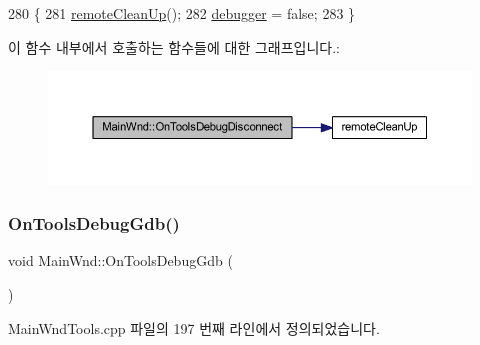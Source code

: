 \begin{DoxyCode}
280 \{
281   \mbox{\hyperlink{_main_wnd_tools_8cpp_ad472decd8f1a11c276d8bfb3740bd8ec}{remoteCleanUp}}();
282   \mbox{\hyperlink{_main_wnd_tools_8cpp_af67e2df4c66ef114f4edb85c06810007}{debugger}} = \textcolor{keyword}{false};
283 \}
\end{DoxyCode}
이 함수 내부에서 호출하는 함수들에 대한 그래프입니다.\+:
\nopagebreak
\begin{figure}[H]
\begin{center}
\leavevmode
\includegraphics[width=350pt]{class_main_wnd_aecca3d7d993909f95fe965275b73efae_cgraph}
\end{center}
\end{figure}
\mbox{\label{class_main_wnd_afd978409fe7d362576094249789ea364}} 
\subsubsection{\texorpdfstring{On\+Tools\+Debug\+Gdb()}{OnToolsDebugGdb()}}
{\footnotesize\ttfamily void Main\+Wnd\+::\+On\+Tools\+Debug\+Gdb (\begin{DoxyParamCaption}{ }\end{DoxyParamCaption})\hspace{0.3cm}{\ttfamily [protected]}}



Main\+Wnd\+Tools.\+cpp 파일의 197 번째 라인에서 정의되었습니다.


